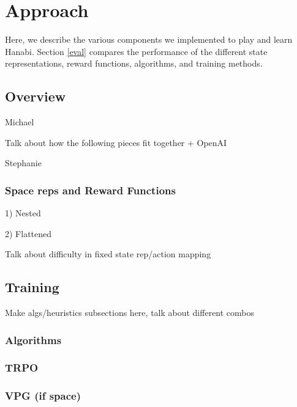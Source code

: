 \section{Approach}
\label{approach}

Here, we describe the various components we implemented to play and learn
Hanabi. Section \ref{eval} compares the performance of the different
state representations, reward functions, algorithms, and training
methods.

\subsection{Overview}
Michael

Talk about how the following pieces fit together + OpenAI


Stephanie 
\subsubsection{Space reps and Reward Functions}



1) Nested

2) Flattened

Talk about difficulty in fixed state rep/action mapping

\subsection{Training}

Make algs/heuristics subsections here, talk about different combos

\subsubsection{Algorithms}

\subsubsection{TRPO}

\cite{TRPO}

\subsubsection{VPG (if space)}
